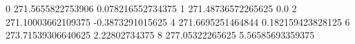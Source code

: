 0 271.5655822753906 0.078216552734375
1 271.48736572265625 0.0
2 271.10003662109375 -0.3873291015625
4 271.6695251464844 0.182159423828125
6 273.71539306640625 2.22802734375
8 277.05322265625 5.56585693359375
